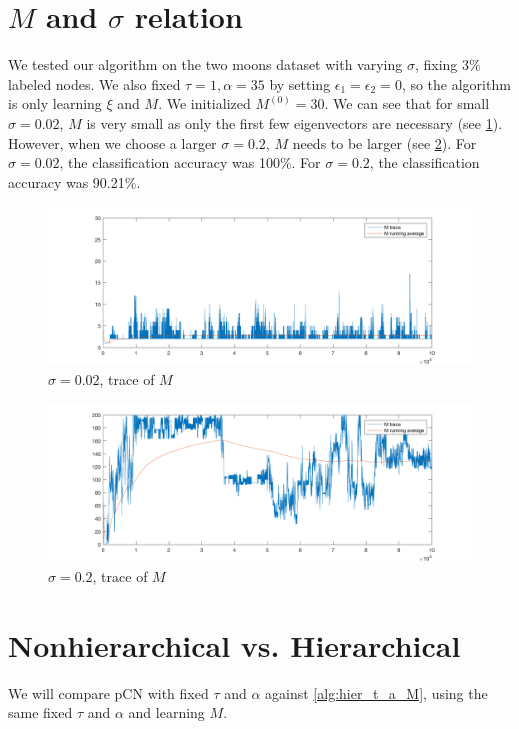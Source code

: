 \documentclass{siamart1116}
\begin{document}
\section{$M$ and $\sigma$ relation}
We tested our algorithm on the two moons dataset with varying $\sigma$, fixing $3\%$ labeled nodes. We also fixed $\tau=1,\alpha=35$ by setting $\epsilon_1=\epsilon_2=0$, so the algorithm is only learning $\xi$ and $M$. We initialized $M^{(0)} = 30$. We can see that for small $\sigma = 0.02$, $M$ is very small as only the first few eigenvectors are necessary (see \cref{fig:learnM_sigma_0.02}). However, when we choose a larger $\sigma = 0.2$, $M$ needs to be larger (see \cref{fig:learnM_sigma_0.20}). For $\sigma = 0.02$, the classification accuracy was 100\%. For $\sigma = 0.2$, the classification accuracy was 90.21\%.

\begin{figure}[!htb]
\caption{\label{fig:learnM_sigma_0.02} $\sigma=0.02$, trace of $M$}
\includegraphics[width=\linewidth]{old/sigma_0_02/M_trace.png}
\end{figure}
\begin{figure}[!htb]
\caption{\label{fig:learnM_sigma_0.20} $\sigma=0.2$, trace of $M$}
\includegraphics[width=\linewidth]{old/sigma_0_20/M_trace.png}
\end{figure}

\section{Nonhierarchical vs. Hierarchical}
We will compare pCN with fixed $\tau$ and $\alpha$ against \cref{alg:hier_t_a_M}, using the same fixed $\tau$ and $\alpha$ and learning $M$.
\end{document}
